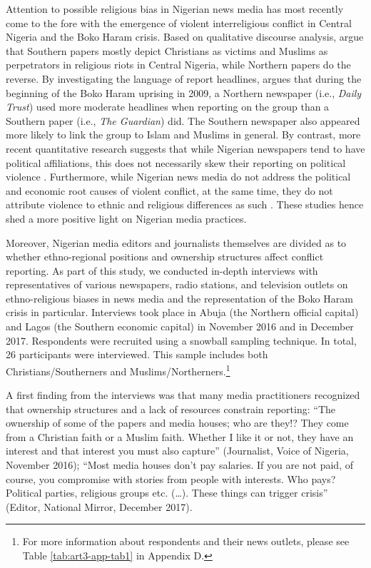 Attention to possible religious bias in Nigerian news media has most recently come to the fore with the emergence of violent interreligious conflict in Central Nigeria and the Boko Haram crisis. Based on qualitative discourse analysis, \cite{Musa2013} argue that Southern papers mostly depict Christians as victims and Muslims as perpetrators in religious riots in Central Nigeria, while Northern papers do the reverse. By investigating the language of report headlines, \cite{Yushau2015} argues that during the beginning of the Boko Haram uprising in 2009, a Northern newspaper (i.e., \textit{Daily Trust}) used more moderate headlines when reporting on the group than a Southern paper (i.e., \textit{The Guardian}) did. The Southern newspaper also appeared more likely to link the group to Islam and Muslims in general. By contrast, more recent quantitative research suggests that while Nigerian newspapers tend to have political affiliations, this does not necessarily skew their reporting on political violence \citep{Demarest2018}. Furthermore, while Nigerian news media do not address the political and economic root causes of violent conflict, at the same time, they do not attribute violence to ethnic and religious differences as such \citep{Demarest2019}. These studies hence shed a more positive light on Nigerian media practices. 


Moreover, Nigerian media editors and journalists themselves are divided as to whether ethno-regional positions and ownership structures affect conflict reporting. As part of this study, we conducted in-depth interviews with representatives of various newspapers, radio stations, and television outlets on ethno-religious biases in news media and the representation of the Boko Haram crisis in particular. Interviews took place in Abuja (the Northern official capital) and Lagos (the Southern economic capital) in November 2016 and in December 2017. Respondents were recruited using a snowball sampling technique. In total, 26 participants were interviewed. This sample includes both Christians/Southerners and Muslims/Northerners.\footnote{For more information about respondents and their news outlets, please see Table \ref{tab:art3-app-tab1} in Appendix D.} 


A first finding from the interviews was that many media practitioners recognized that ownership structures and a lack of resources constrain reporting: ``The ownership of some of the papers and media houses; who are they!? They come from a Christian faith or a Muslim faith. Whether I like it or not, they have an interest and that interest you must also capture'' (Journalist, Voice of Nigeria, November 2016); ``Most media houses don't pay salaries. If you are not paid, of course, you compromise with stories from people with interests. Who pays? Political parties, religious groups etc. ({\dots}). These things can trigger crisis'' (Editor, National Mirror, December 2017). 


